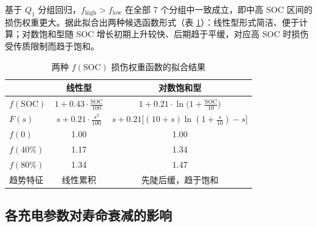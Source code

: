\documentclass[withoutpreface]{cumcmthesis}
\begin{document}
基于 $Q_1$ 分组回归，$f_{\mathrm{high}}>f_{\mathrm{low}}$ 在全部 7 个分组中一致成立，即中高 SOC 区间的损伤权重更大。据此拟合出两种候选函数形式（表 \ref{tab:fsoc}）：线性型形式简洁、便于计算；对数饱和型随 SOC 增长初期上升较快、后期趋于平缓，对应高 SOC 时损伤受传质限制而趋于饱和。

\begin{table}[htbp]
\centering
\caption{两种 $f(\text{SOC})$ 损伤权重函数的拟合结果}
\label{tab:fsoc}
\begin{tabular}{lcc}
\toprule
 & 线性型 & 对数饱和型 \\
\midrule
$f(\text{SOC})$ & $1+0.43\cdot\frac{\mathrm{SOC}}{100}$ & $1+0.21\cdot\ln\!\big(1+\frac{\mathrm{SOC}}{10}\big)$ \\
$F(s)$ & $s+0.21\cdot\frac{s^{2}}{100}$ & $s+0.21\big[(10+s)\ln(1+\frac{s}{10})-s\big]$ \\
$f(0)$ & 1.00 & 1.00 \\
$f(40\%)$ & 1.17 & 1.34 \\
$f(80\%)$ & 1.34 & 1.47 \\
趋势特征 & 线性累积 & 先陡后缓，趋于饱和 \\
\bottomrule
\end{tabular}
\end{table}

\subsection{各充电参数对寿命衰减的影响}
\end{document}
